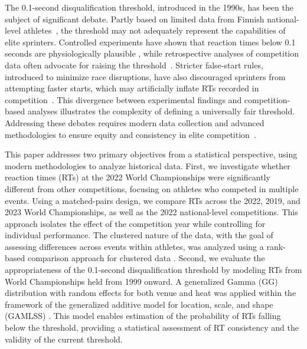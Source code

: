 \documentclass[12pt, letterpaper]{article}
\begin{document}
The 0.1-second disqualification threshold, introduced in the 1990s,
has been the subject of significant debate. Partly based on limited
data from Finnish national-level athletes~\cite{mero1990reaction}, the
threshold may not adequately represent the capabilities of elite
sprinters. Controlled experiments have shown that reaction times below
0.1 seconds are physiologically plausible \citep{pain2007sprint,
  komi2009iaaf}, while retrospective analyses of competition data
often advocate for raising the threshold~\cite{brosnan2017effects,
  lipps2011implications}. Stricter false-start rules, introduced to
minimize race disruptions, have also discouraged sprinters from
attempting faster starts, which may artificially inflate RTs recorded
in competition~\cite{haugen2013effect}. This divergence between
experimental findings and competition-based analyses illustrates the
complexity of defining a universally fair threshold. Addressing these
debates requires modern data collection and advanced methodologies to
ensure equity and consistency in elite
competition~\cite{milloz2021sprint}.


This paper addresses two primary objectives from a statistical
perspective, using modern methodologies to analyze historical
data. First, we investigate whether reaction times (RTs) at the 2022
World Championships were significantly different from other
competitions, focusing on athletes who competed in multiple
events. Using a matched-pairs design, we compare RTs across the 2022,
2019, and 2023 World Championships, as well as the 2022 national-level
competitions. This approach isolates the effect of the competition
year while controlling for individual performance. The clustered
nature of the data, with the goal of assessing differences across
events within athletes, was analyzed using a rank-based comparison
approach for clustered data \citep{datta2005rank}. Second, we evaluate
the appropriateness of the 0.1-second disqualification threshold by
modeling RTs from World Championships held from 1999 onward. A
generalized Gamma (GG) distribution with random effects for both venue and
heat was applied within the framework of the generalized additive
model for location, scale, and shape (GAMLSS)
\citep{rigby2005generalized, stasinopoulos2024generalized}.
This model enables estimation of the
probability of RTs falling below the threshold, providing a
statistical assessment of RT consistency and the validity of the
current threshold.
\end{document}
